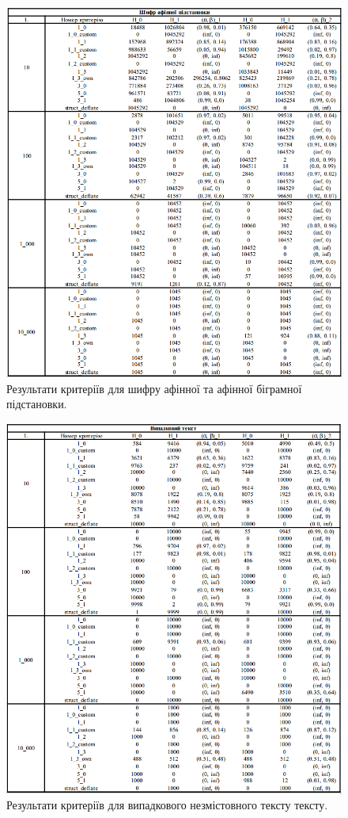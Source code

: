  \begin{figure}[!h]
    		\centering
    		\includegraphics[scale = 0.55]{Images/affine_substitution.png}
    		\caption{Результати критеріїв для шифру афінної та афінної біграмної підстановки.}
    		\label{fig:affine_substitution}
	\end{figure}
 \begin{figure}[!h]
    		\centering
    		\includegraphics[scale = 0.55]{Images/random_text.png}
    		\caption{Результати критеріїв для випадкового незмістовного тексту тексту.}
    		\label{fig:random_text}
	\end{figure}
